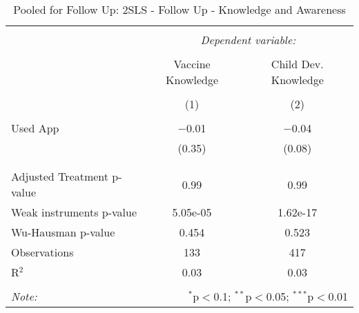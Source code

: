 
\begin{table}[!htbp] \centering 
  \caption{Pooled for Follow Up: 2SLS - Follow Up - Knowledge and Awareness} 
  \label{tbl:Pooled for Follow Up: 2SLS - Follow Up - Knowledge and Awareness} 
\begin{tabular}{@{\extracolsep{5pt}}lcc} 
\\[-1.8ex]\hline 
\hline \\[-1.8ex] 
 & \multicolumn{2}{c}{\textit{Dependent variable:}} \\ 
\cline{2-3} 
\\[-1.8ex] & Vaccine Knowledge & Child Dev. Knowledge \\ 
\\[-1.8ex] & (1) & (2)\\ 
\hline \\[-1.8ex] 
 Used App & $-$0.01 & $-$0.04 \\ 
  & (0.35) & (0.08) \\ 
  & & \\ 
\hline \\[-1.8ex] 
Adjusted Treatment p-value & 0.99 & 0.99 \\ 
Weak instruments p-value & 5.05e-05 & 1.62e-17 \\ 
Wu-Hausman p-value & 0.454 & 0.523 \\ 
Observations & 133 & 417 \\ 
R$^{2}$ & 0.03 & 0.03 \\ 
\hline 
\hline \\[-1.8ex] 
\textit{Note:}  & \multicolumn{2}{r}{$^{*}$p$<$0.1; $^{**}$p$<$0.05; $^{***}$p$<$0.01} \\ 
\end{tabular} 
\end{table} 
